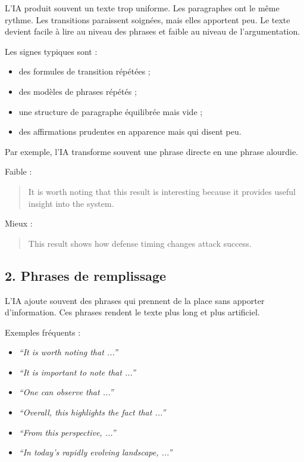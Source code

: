 \documentclass[11pt,a4paper]{article}
\theoremstyle{definition}
\begin{document}
L'IA produit souvent un texte trop uniforme. Les paragraphes ont le même rythme.
Les transitions paraissent soignées, mais elles apportent peu. Le texte devient facile à lire au niveau des phrases et faible au niveau de l'argumentation.

Les signes typiques sont :
\begin{itemize}
    \item des formules de transition répétées ;
    \item des modèles de phrases répétés ;
    \item une structure de paragraphe équilibrée mais vide ;
    \item des affirmations prudentes en apparence mais qui disent peu.
\end{itemize}

Par exemple, l'IA transforme souvent une phrase directe en une phrase alourdie.

Faible :
\begin{quote}
It is worth noting that this result is interesting because it provides useful insight into the system.
\end{quote}

Mieux :
\begin{quote}
This result shows how defense timing changes attack success.
\end{quote}

\subsection*{2. Phrases de remplissage}

L'IA ajoute souvent des phrases qui prennent de la place sans apporter d'information.
Ces phrases rendent le texte plus long et plus artificiel.

Exemples fréquents :
\begin{itemize}
    \item \textit{``It is worth noting that ...''}
    \item \textit{``It is important to note that ...''}
    \item \textit{``One can observe that ...''}
    \item \textit{``Overall, this highlights the fact that ...''}
    \item \textit{``From this perspective, ...''}
    \item \textit{``In today's rapidly evolving landscape, ...''}
\end{itemize}
\end{document}
